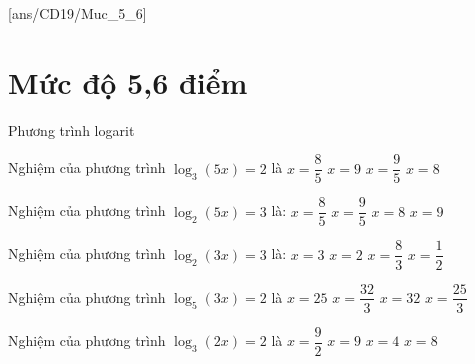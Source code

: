 [ans/CD19/Muc_5_6]
\setcounter{ex}{0}
\setcounter{dang}{0}
\section{Mức độ 5,6 điểm}
\begin{dang}
	{Phương trình logarit}
\end{dang}
\begin{ex}           
	[Mã 101 - 2021 Lần 1]%
	Nghiệm của phương trình $\log_3\left(5x\right)=2$ là 
	\choice
	{$x=\dfrac{8}{5}$}
	{$x=9$}
	{\True $x=\dfrac{9}{5}$}
	{$x=8$}
\end{ex}
\begin{ex}
	[Mã 104 - 2021 Lần 1]%
	Nghiệm của phương trình $\log_2\left(5x\right)=3$ là:
	\choice
	{\True $x=\dfrac{8}{5}$}
	{$x=\dfrac{9}{5}$}
	{$x=8$}
	{$x=9$}
\end{ex}
\begin{ex}
	Nghiệm của phương trình $\log_2\left(3x\right)=3$ là:
	\choice
	{$x=3$}
	{$x=2$}
	{\True $x=\dfrac{8}{3}$}
	{$x=\dfrac{1}{2}$}
\end{ex}
\begin{ex}
	[Mã 102 - 2021 Lần 1]%
	Nghiệm của phương trình $\log_5\left(3x\right)=2$ là
	\choice
	{$x=25$}
	{$x=\dfrac{32}{3}$}
	{$x=32$}
	{\True $x=\dfrac{25}{3}$}
\end{ex}
\begin{ex}
	[Mã 103 - 2021 - Lần 1]%
	Nghiệm của phương trình $\log_3\left(2x\right)=2$ là
	\choice
	{\True $x=\dfrac{9}{2}$}
	{$x=9$}
	{$x=4$}
	{$x=8$}
\end{ex}
